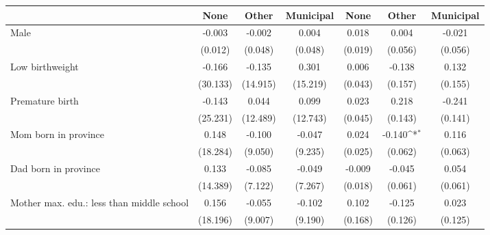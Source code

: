 {
\def\sym#1{\ifmmode^{#1}\else\(^{#1}\)\fi}
\begin{tabular}{l*{6}{c}}
\toprule
                    &\multicolumn{1}{c}{None}&\multicolumn{1}{c}{Other}&\multicolumn{1}{c}{Municipal}&\multicolumn{1}{c}{None}&\multicolumn{1}{c}{Other}&\multicolumn{1}{c}{Municipal}\\
\midrule
Male                &      -0.003         &      -0.002         &       0.004         &       0.018         &       0.004         &      -0.021         \\
                    &     (0.012)         &     (0.048)         &     (0.048)         &     (0.019)         &     (0.056)         &     (0.056)         \\
\addlinespace
Low birthweight     &      -0.166         &      -0.135         &       0.301         &       0.006         &      -0.138         &       0.132         \\
                    &    (30.133)         &    (14.915)         &    (15.219)         &     (0.043)         &     (0.157)         &     (0.155)         \\
\addlinespace
Premature birth     &      -0.143         &       0.044         &       0.099         &       0.023         &       0.218         &      -0.241         \\
                    &    (25.231)         &    (12.489)         &    (12.743)         &     (0.045)         &     (0.143)         &     (0.141)         \\
\addlinespace
Mom born in province&       0.148         &      -0.100         &      -0.047         &       0.024         &      -0.140\sym{*}  &       0.116         \\
                    &    (18.284)         &     (9.050)         &     (9.235)         &     (0.025)         &     (0.062)         &     (0.063)         \\
\addlinespace
Dad born in province&       0.133         &      -0.085         &      -0.049         &      -0.009         &      -0.045         &       0.054         \\
                    &    (14.389)         &     (7.122)         &     (7.267)         &     (0.018)         &     (0.061)         &     (0.061)         \\
\addlinespace
Mother max. edu.: less than middle school&       0.156         &      -0.055         &      -0.102         &       0.102         &      -0.125         &       0.023         \\
                    &    (18.196)         &     (9.007)         &     (9.190)         &     (0.168)         &     (0.126)         &     (0.125)         \\

\end{tabular}}
